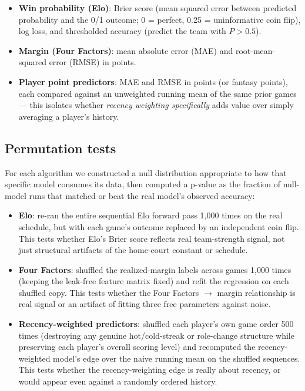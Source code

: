 \documentclass[11pt]{article}
\begin{document}
\begin{itemize}
    \item \textbf{Win probability (Elo)}: Brier score (mean squared error between predicted probability and
    the 0/1 outcome; 0 = perfect, 0.25 = uninformative coin flip), log loss, and thresholded accuracy
    (predict the team with $P > 0.5$).
    \item \textbf{Margin (Four Factors)}: mean absolute error (MAE) and root-mean-squared error (RMSE) in
    points.
    \item \textbf{Player point predictors}: MAE and RMSE in points (or fantasy points), each compared against
    an unweighted running mean of the same prior games — this isolates whether \emph{recency weighting
    specifically} adds value over simply averaging a player's history.
\end{itemize}

\subsection{Permutation tests}

For each algorithm we constructed a null distribution appropriate to how that specific model consumes its
data, then computed a p-value as the fraction of null-model runs that matched or beat the real model's
observed accuracy:

\begin{itemize}
    \item \textbf{Elo}: re-ran the entire sequential Elo forward pass 1,000 times on the real schedule, but
    with each game's outcome replaced by an independent coin flip. This tests whether Elo's Brier score
    reflects real team-strength signal, not just structural artifacts of the home-court constant or schedule.
    \item \textbf{Four Factors}: shuffled the realized-margin labels across games 1,000 times (keeping the
    leak-free feature matrix fixed) and refit the regression on each shuffled copy. This tests whether the
    Four Factors $\to$ margin relationship is real signal or an artifact of fitting three free parameters
    against noise.
    \item \textbf{Recency-weighted predictors}: shuffled each player's own game order 500 times (destroying
    any genuine hot/cold-streak or role-change structure while preserving each player's overall scoring
    level) and recomputed the recency-weighted model's edge over the naive running mean on the shuffled
    sequences. This tests whether the recency-weighting edge is really about recency, or would appear even
    against a randomly ordered history.
\end{itemize}
\end{document}

